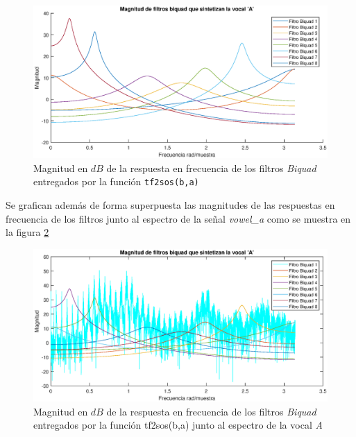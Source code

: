 \begin{figure}[H]
    \centering
    \includegraphics[scale = 0.6]{figures/4_4.eps}
    \caption{Magnitud en $dB$ de la respuesta en frecuencia de los filtros \textit{ \textit{Biquad}} entregados por la función \texttt{tf2sos(b,a)}}
    \label{Biquads}
\end{figure}


Se grafican además de forma superpuesta las magnitudes de las respuestas en frecuencia de los filtros junto al espectro de la señal \textit{vowel\_a} como se muestra en la figura \ref{Biquadss_vocal}

\begin{figure}[H]
    \centering
    \includegraphics[scale = 0.6]{figures/4_4_vocal.eps}
    \caption{Magnitud en $dB$ de la respuesta en frecuencia de los filtros \textit{ \textit{Biquad}} entregados por la función tf2sos(b,a) junto al espectro de la vocal \textit{A}}
    \label{Biquadss_vocal}
\end{figure}





